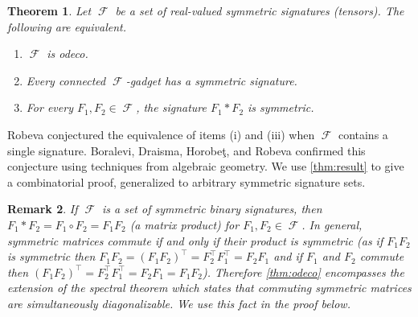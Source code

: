 \documentclass{article}
\newtheorem{theorem}{Theorem}\newtheorem{lemma}[theorem]{Lemma}\newtheorem{proposition}[theorem]{Proposition}\newtheorem{corollary}[theorem]{Corollary}\newtheorem{definition}[theorem]{Definition}\newtheorem{claim}[theorem]{Claim}\newtheorem{remark}[theorem]{Remark}\newtheorem{conjecture}[theorem]{Conjecture}
\DeclareMathOperator{\fc}{\mathcal{F}}
\begin{document}
\begin{theorem}
    \label{thm:odeco}
    Let $\fc$ be a set of real-valued symmetric signatures (tensors). The following are equivalent.
    \begin{enumerate}[label=(\roman*)]
        \item $\fc$ is odeco.
        \item Every connected $\fc$-gadget has a symmetric signature.
        \item For every $F_1,F_2 \in \fc$, the signature $F_1 * F_2$ is symmetric.
    \end{enumerate}
\end{theorem}

Robeva \cite{robeva} conjectured the equivalence of items (i) and (iii) when $\fc$
contains a single signature.
Boralevi, Draisma, Horobeţ, and Robeva \cite{boralevi_orthogonal_2017} confirmed this conjecture
using techniques from algebraic geometry.
We use \autoref{thm:result} to give a combinatorial proof, generalized to arbitrary symmetric
signature sets.
\begin{remark}
    If $\fc$ is a set of symmetric binary signatures, then $F_1 * F_2 = F_1 \circ F_2 = F_1F_2$
    (a matrix product) for $F_1,F_2 \in \fc$. In general, symmetric matrices commute if and only
    if their product is symmetric (as if $F_1F_2$ is symmetric then $F_1F_2 = (F_1F_2)^\top = F_2^\top
    F_1^\top = F_2F_1$ and if $F_1$ and $F_2$ commute then $(F_1F_2)^\top = F_2^\top F_1^\top = F_2F_1 = F_1F_2$).
    Therefore \autoref{thm:odeco} encompasses the extension of the spectral theorem
    which states that commuting symmetric matrices are simultaneously diagonalizable. We use this
    fact in the proof below.
    \label{rem:spectral}
\end{remark}
\end{document}
